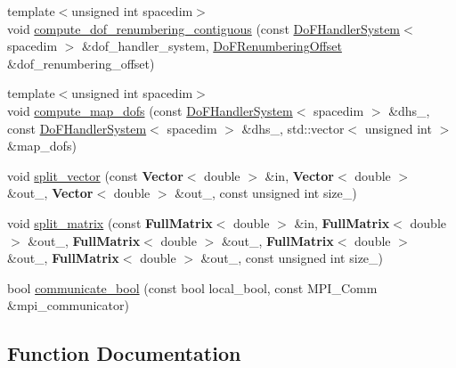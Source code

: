 \begin{DoxyCompactItemize}
\item 
{\footnotesize template$<$unsigned int spacedim$>$ }\\void \hyperlink{namespace_auxiliary_a4261fc726ff965166f3f53242918acea}{compute\+\_\+dof\+\_\+renumbering\+\_\+contiguous} (const \hyperlink{class_do_f_handler_system}{Do\+F\+Handler\+System}$<$ spacedim $>$ \&dof\+\_\+handler\+\_\+system, \hyperlink{class_do_f_renumbering_offset}{Do\+F\+Renumbering\+Offset} \&dof\+\_\+renumbering\+\_\+offset)
\item 
{\footnotesize template$<$unsigned int spacedim$>$ }\\void \hyperlink{namespace_auxiliary_a072f85e6d745ae3c532bb0612f4bd3ce}{compute\+\_\+map\+\_\+dofs} (const \hyperlink{class_do_f_handler_system}{Do\+F\+Handler\+System}$<$ spacedim $>$ \&dhs\+\_, const \hyperlink{class_do_f_handler_system}{Do\+F\+Handler\+System}$<$ spacedim $>$ \&dhs\+\_, std\+::vector$<$ unsigned int $>$ \&map\+\_\+dofs)
\item 
void \hyperlink{namespace_auxiliary_a59c01a6511bffd7442693e86cd194ef1}{split\+\_\+vector} (const {\bf Vector}$<$ double $>$ \&in, {\bf Vector}$<$ double $>$ \&out\+\_, {\bf Vector}$<$ double $>$ \&out\+\_, const unsigned int size\+\_)
\item 
void \hyperlink{namespace_auxiliary_af746a1d08b1135a3684fc990f7b1384d}{split\+\_\+matrix} (const {\bf Full\+Matrix}$<$ double $>$ \&in, {\bf Full\+Matrix}$<$ double $>$ \&out\+\_, {\bf Full\+Matrix}$<$ double $>$ \&out\+\_, {\bf Full\+Matrix}$<$ double $>$ \&out\+\_, {\bf Full\+Matrix}$<$ double $>$ \&out\+\_, const unsigned int size\+\_)
\item 
bool \hyperlink{namespace_auxiliary_ad0ff28386be7b54b3487ae36e5a074fa}{communicate\+\_\+bool} (const bool local\+\_\+bool, const M\+P\+I\+\_\+\+Comm \&mpi\+\_\+communicator)
\end{DoxyCompactItemize}


\subsection{Function Documentation}
